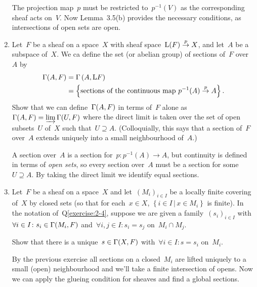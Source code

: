 \documentclass[a4paper,11pt,oneside,openany,article]{memoir}
\begin{document}
\begin{enumerate}
    \begin{solution}
      The projection map~$p$ must be restricted to~$p^{-1}(V)$ as the corresponding sheaf acts on~$V$. Now Lemma~3.5(b) provides the necessary conditions, as intersections of open sets are open.
    \end{solution}

  \item\label{exercise:2-4} Let~$F$ be a sheaf on a space~$X$ with sheaf space~$\mathrm{L}(F)\overset{p}{\rightarrow} X$, and let~$A$ be a subspace of~$X$. We ca define the set (or abelian group) of sections of~$F$ over~$A$ by
    \begin{align}
      \mathrm{\Gamma}(A,F)&=\mathrm{\Gamma}\left( A,\mathrm{L} F \right) \\
      &=\left\{ \text{sections of the continuous map $p^{-1}(A)\overset{p}{\rightarrow}A$} \right\}.
    \end{align}
    Show that we can define~$\mathrm{\Gamma}(A,F)$ in terms of~$F$ alone as~$\mathrm{\Gamma}(A,F)=\varinjlim\mathrm{\Gamma}(U,F)$ where the direct limit is taken over the set of open subsets~$U$ of~$X$ such that~$U\supseteq A$. (Colloquially, this says that a section of~$F$ over~$A$ extends uniquely into a small neighbourhood of~$A$.)

    \begin{solution}
      A section over~$A$ is a section for~$p\colon p^{-1}(A)\to A$, but continuity is defined in terms of \emph{open sets}, so every section over~$A$ must be a section for some~$U\supseteq A$. By taking the direct limit we identify equal sections.
    \end{solution}

  \item\label{exercise:2-5} Let~$F$ be a sheaf on a space~$X$ and let~$(M_i)_{i\in I}$ be a locally finite covering of~$X$ by closed sets (so that for each~$x\in X$, $\left\{ i\in I\,|\,x\in M_i \right\}$ is finite). In the notation of~Q\ref{exercise:2-4}, suppose we are given a family~$(s_i)_{i\in I}$ with~$\forall i\in I\colon s_i\in\mathrm{\Gamma}(M_i,F)$ and~$\forall i,j\in I\colon s_i=s_j$ on~$M_i\cap M_j$.

    Show that there is a unique~$s\in\mathrm{\Gamma}(X,F)$ with~$\forall i\in I\colon s=s_i$ on~$M_i$.

    \begin{solution}
      By the previous exercise all sections on a closed~$M_i$ are lifted uniquely to a small (open) neighbourhood and we'll take a finite intersection of opens. Now we can apply the glueing condition for sheaves and find a global sections.
    \end{solution}


\end{enumerate}
\end{document}
